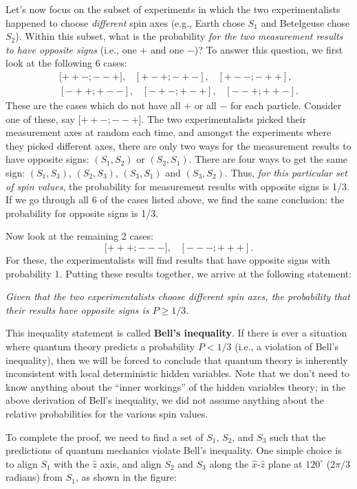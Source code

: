 \documentclass[pra,11pt]{revtex4}
\begin{document}
Let's now focus on the subset of experiments in which the two
experimentalists happened to choose \textit{different} spin axes
(e.g., Earth chose $S_1$ and Betelgeuse chose $S_2$).  Within this
subset, what is the probability \textit{for the two measurement
  results to have opposite signs} (i.e., one $+$ and one $-$)?  To
answer this question, we first look at the following 6 cases:
$$\begin{aligned}{[}{++-};{--+}], \;\;\; [{+-+};{-+-}], \;\;\; [{+--};{-++}],\\ [{-++};{+--}], \;\;\; [{-+-};{+-+}], \;\;\; [{--+};{++-}].\end{aligned}$$
These are the cases which do not have all $+$ or all $-$ for each
particle.  Consider one of these, say ${[}{++-};{--+}]$.  The two
experimentalists picked their measurement axes at random each time,
and amongst the experiments where they picked different axes, there
are only two ways for the measurement results to have opposite signs:
$(S_1,S_2)$ or $(S_2,S_1)$.  There are four ways to get the same sign:
$(S_1,S_3)$, $(S_2,S_3)$, $(S_3,S_1)$ and $(S_3, S_2)$.  Thus,
\textit{for this particular set of spin values}, the probability for
measurement results with opposite signs is 1/3.  If we go through all
6 of the cases listed above, we find the same conclusion: the
probability for opposite signs is 1/3.

Now look at the remaining 2 cases:
$${[}{+++};{---}], \;\;\; [{---};{+++}].$$
For these, the experimentalists will find results that have opposite
signs with probability 1.  Putting these results together, we arrive
at the following statement:

\textit{Given that the two experimentalists choose different spin
  axes, the probability that their results have opposite signs is $P
  \ge 1/3$.}

This inequality statement is called \textbf{Bell's inequality}.  If
there is ever a situation where quantum theory predicts a probability
$P < 1/3$ (i.e., a violation of Bell's inequality), then we will be
forced to conclude that quantum theory is inherently inconsistent with
local deterministic hidden variables.  Note that we don't need to know
anything about the ``inner workings'' of the hidden variables theory;
in the above derivation of Bell's inequality, we did not assume
anything about the relative probabilities for the various spin values.

To complete the proof, we need to find a set of $S_1$, $S_2$, and
$S_3$ such that the predictions of quantum mechanics violate Bell's
inequality.  One simple choice is to align $S_1$ with the $\hat{z}$
axis, and align $S_2$ and $S_3$ along the $\hat{x}$-$\hat{z}$ plane at
$120^\circ$ ($2\pi/3$ radians) from $S_1$, as shown in the figure:
\end{document}
